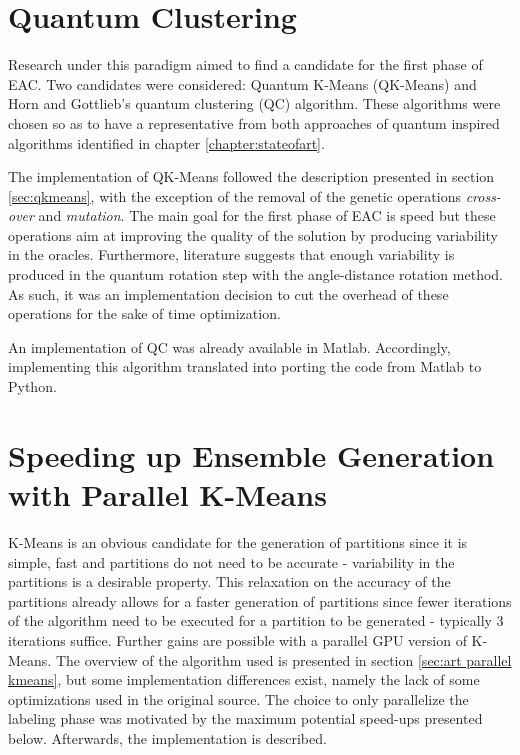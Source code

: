 \section{Quantum Clustering}

Research under this paradigm aimed to find a candidate for the first phase of EAC.
Two candidates were considered: Quantum K-Means (QK-Means) and Horn and Gottlieb's quantum clustering (QC) algorithm.
These algorithms were chosen so as to have a representative from both approaches of quantum inspired algorithms identified in chapter \ref{chapter:stateofart}.


The implementation of QK-Means followed the description presented in section \ref{sec:qkmeans}, with the exception of the removal of the genetic operations \emph{cross-over} and \emph{mutation}.
The main goal for the first phase of EAC is speed but these operations aim at improving the quality of the solution by producing variability in the oracles.
Furthermore, literature \cite{Liu2010} suggests that enough variability is produced in the quantum rotation step with the angle-distance rotation method.
As such, it was an implementation decision to cut the overhead of these operations for the sake of time optimization.

An implementation of QC was already available in Matlab.
Accordingly, implementing this algorithm translated into porting the code from Matlab to Python.




\section{Speeding up Ensemble Generation with Parallel K-Means}

K-Means is an obvious candidate for the generation of partitions since it is simple, fast and partitions do not need to be accurate - variability in the partitions is a desirable property.
This relaxation on the accuracy of the partitions already allows for a faster generation of partitions since fewer iterations of the algorithm need to be executed for a partition to be generated - typically 3 iterations suffice.
Further gains are possible with a parallel GPU version of K-Means.
The overview of the algorithm used is presented in section \ref{sec:art parallel kmeans}, but some implementation differences exist, namely the lack of some optimizations used in the original source.
The choice to only parallelize the labeling phase was motivated by the maximum potential speed-ups presented below.
Afterwards, the implementation is described.

